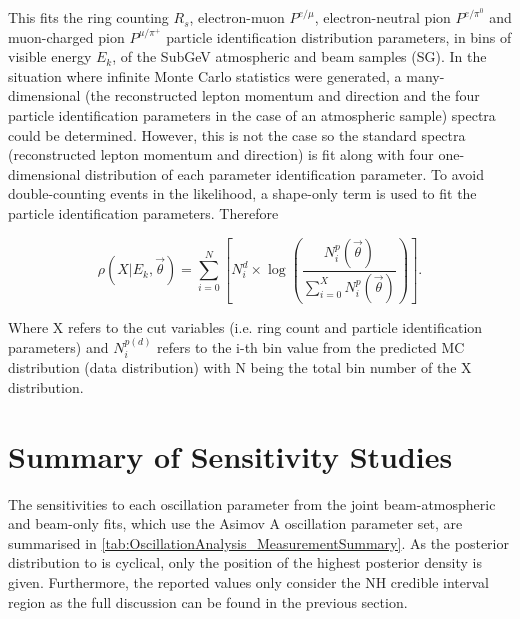 This fits the ring counting $R_s$, electron-muon $P^{e/\mu}$, electron-neutral pion $P^{e/\pi^0}$ and muon-charged pion $P^{\mu/\pi^+}$ particle identification distribution parameters, in bins of visible energy $E_k$, of the SubGeV atmospheric and beam samples (SG). In the situation where infinite Monte Carlo statistics were generated, a many-dimensional (the reconstructed lepton momentum and direction and the four particle identification parameters in the case of an atmospheric sample) spectra could be determined. However, this is not the case so the standard spectra (reconstructed lepton momentum and direction) is fit along with four one-dimensional distribution of each parameter identification parameter. To avoid double-counting events in the likelihood, a shape-only term is used to fit the particle identification parameters. Therefore

\begin{equation}
\rho(X | E_k, \vec{\theta}) = \sum^{N}_{i = 0} \left[ N_i^d \times \log \left( \frac{N_i^p (\vec{\theta})}{\sum^{X}_{i = 0}N_i^p (\vec{\theta})} \right) \right].
\end{equation}

Where X refers to the cut variables (i.e. ring count and particle identification parameters) and $N_{i}^{p(d)}$ refers to the i-th bin value from the predicted MC distribution (data distribution) with N being the total bin number of the X distribution.
\fi

\clearpage
\section{Summary of Sensitivity Studies}
\label{sec:OA_Summary}

The sensitivities to each oscillation parameter from the joint beam-atmospheric and beam-only fits, which use the Asimov A oscillation parameter set, are summarised in \autoref{tab:OscillationAnalysis_MeasurementSummary}. As the posterior distribution to  is cyclical, only the position of the highest posterior density is given. Furthermore, the  reported values only consider the NH credible interval region as the full discussion can be found in the previous section.

